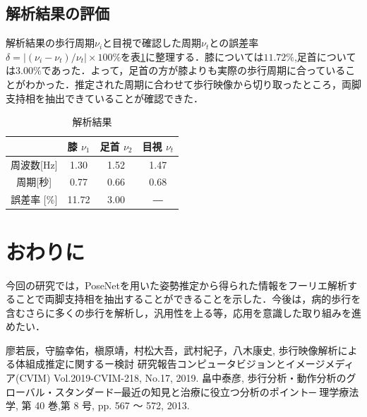\documentclass[a4j]{cis-resume}
\begin{document}
\subsection{解析結果の評価}
解析結果の歩行周期$\nu_i$と目視で確認した周期$\nu_t$との誤差率$\delta =|(\nu_i-\nu_t)/\nu_t|\times100\%$を表\ref{tab:結果}に整理する．膝については$11.72\%$,足首については$3.00\%$であった．よって，足首の方が膝よりも実際の歩行周期に合っていることがわかった．推定された周期に合わせて歩行映像から切り取ったところ，両脚支持相を抽出できていることが確認できた．
\begin{table}[H]
  \caption{解析結果} \label{tab:結果}
  \begin{tabular}{c||ccc}
    \hline
            & 膝 $\nu_1$    & 足首 $\nu_2$  & 目視 $\nu_t$  \\ \hline
周波数{[}Hz{]} & 1.30  & 1.52 & 1.47 \\ \hline
周期{[}秒{]}   & 0.77  & 0.66 & 0.68 \\ \hline
誤差率 {[}$\%${]}      & 11.72 & 3.00 &   ―   \\ \hline
  \end{tabular}
\end{table}

\section{おわりに} \label{sec:summary}
今回の研究では，PoseNetを用いた姿勢推定から得られた情報をフーリエ解析することで両脚支持相を抽出することができることを示した．今後は，病的歩行を含むさらに多くの歩行を解析し，汎用性を上る等，応用を意識した取り組みを進めたい．

\begin{thebibliography}{9}
   廖若辰，守脇幸佑，槇原靖，村松大吾，武村紀子，八木康史, 歩行映像解析による体組成推定に関するー検討 研究報告コンピュータビジョンとイメージメディア(CVIM) Vol.2019-CVIM-218, No.17, 2019.
   畠中泰彦, 歩行分析・動作分析のグローバル・スタンダード─最近の知見と治療に役立つ分析のポイント─ 理学療法学, 第 40 巻,第 8 号, pp. 567 ～ 572, 2013.
\end{thebibliography}
\end{document}
